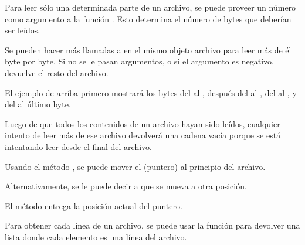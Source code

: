 
Para leer sólo una determinada parte de un archivo, se puede proveer un número como argumento a la función .
Esto determina el número de bytes que deberían ser leídos.

Se pueden hacer más llamadas a  en el mismo objeto archivo para leer más de él byte por byte.
Si no se le pasan argumentos, o si el argumento es negativo,  devuelve el resto del archivo.


El ejemplo de arriba primero mostrará los bytes del  al , después del  al , del  al , y del  al último byte.

Luego de que todos los contenidos de un archivo hayan sido leídos, cualquier intento de leer más de ese archivo devolverá una cadena vacía \ttt{\qq \qq} porque se está intentando leer desde el final del archivo.


Usando el método , se puede mover el  (puntero) al principio del archivo.


Alternativamente, se le puede decir a  que se mueva a otra posición.


El método  entrega la posición actual del puntero.


Para obtener cada línea de un archivo, se puede usar la función  para devolver una lista donde cada elemento es una línea del archivo.


